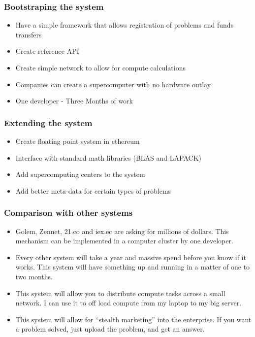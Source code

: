 \documentclass{beamer}
\begin{document}
\begin{frame}
  \frametitle{Bootstraping the system}
  \begin{itemize}
    \item Have a simple framework that allows registration of problems and
      funds transfers
    \item Create reference API
    \item Create simple network to allow for compute calculations
    \item Companies can create a supercomputer with no hardware outlay
    \item One developer - Three Months of work
  \end{itemize}
\end{frame}
\begin{frame}
  \frametitle{Extending the system}
  \begin{itemize}
  \item Create floating point system in ethereum
  \item Interface with standard math libraries (BLAS and LAPACK)
  \item Add supercomputing centers to the system
  \item Add better meta-data for certain types of problems
  \end{itemize}
\end{frame}
\begin{frame}
  \frametitle{Comparison with other systems}
  \begin{itemize}
    \item Golem, Zennet, 21.co and iex.ec are asking for millions of
      dollars.  This mechanism can be implemented in a computer
      cluster by one developer.
    \item Every other system will take a year and massive spend before
      you know if it works.  This system will have something up and
      running in a matter of one to two months.
    \item This system will allow you to distribute compute tasks
      across a small network. I can use it to off load compute from my
      laptop to my big server.
    \item This system will allow for ``stealth marketing'' into the
      enterprise.  If you want a problem solved, just upload the
      problem, and get an answer.
  \end{itemize}
\end{frame}
\end{document}
